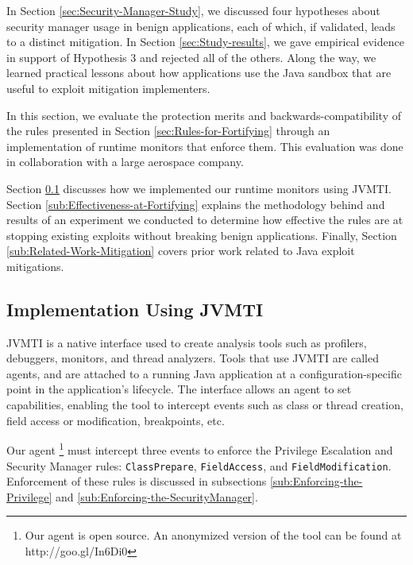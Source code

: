 \documentclass{sig-alternate}
\begin{document}
In Section \ref{sec:Security-Manager-Study}, we discussed four hypotheses about security manager usage in benign applications, each
of which, if validated, leads to a distinct mitigation. In Section
\ref{sec:Study-results}, we gave empirical evidence in support of
Hypothesis 3 and rejected all of the others. Along the way, we learned
practical lessons about how applications use the Java sandbox that
are useful to exploit mitigation implementers. 

In this section, we evaluate the protection merits and backwards-compatibility of the rules presented in Section \ref{sec:Rules-for-Fortifying} through an implementation of runtime monitors that enforce them. This evaluation was done in collaboration
with a large aerospace company.

Section \ref{sub:Implementation-Using-JVMTI} discusses how we implemented
our runtime monitors using JVMTI. Section \ref{sub:Effectiveness-at-Fortifying}
explains the methodology behind and results of an experiment we conducted
to determine how effective the rules are at stopping existing exploits without breaking benign applications. Finally, Section
\ref{sub:Related-Work-Mitigation} covers prior work related to Java exploit mitigations.

\subsection{Implementation Using JVMTI}\label{sub:Implementation-Using-JVMTI}

JVMTI is a native interface used to create
analysis tools such as profilers, debuggers, monitors, and thread
analyzers. Tools that use JVMTI are called agents, and are attached
to a running Java application at a configuration-specific point in
the application's lifecycle. The interface allows an agent to set
capabilities, enabling the tool to intercept events such as class
or thread creation, field access or modification, breakpoints, etc.

Our agent \footnote{Our agent is open source. An anonymized version
of the tool can be found at http://goo.gl/In6Di0} must intercept three events to enforce the Privilege Escalation
and Security Manager rules: \texttt{ClassPrepare}, \texttt{FieldAccess},
and \texttt{FieldModification}. Enforcement of these rules is discussed in subsections \ref{sub:Enforcing-the-Privilege} and \ref{sub:Enforcing-the-SecurityManager}.
\end{document}
